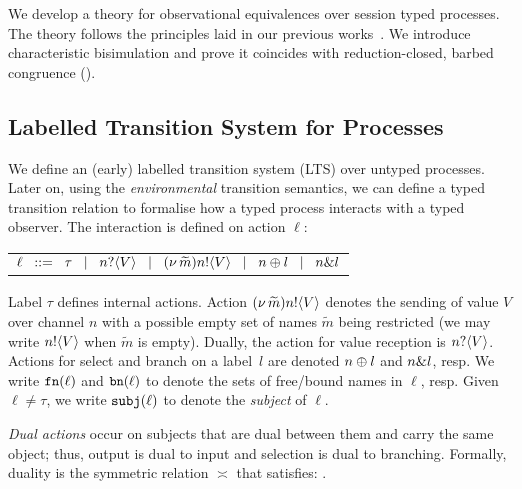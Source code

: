 \noi We develop a theory for observational equivalences over
session typed \HOp processes. The theory follows the principles
laid in our previous works~\cite{KYHH2015,KY2015}.
We introduce 
characteristic bisimulation
and prove
it coincides
with reduction-closed,
barbed congruence ().


\subsection{Labelled Transition System for Processes}\label{ss:lts}
\noi We define an (early) labelled transition system (LTS) over
untyped processes. 
Later on, using the \emph{environmental} transition semantics, 
we can define a typed transition relation to formalise 
how a typed process interacts with a typed observer. 
The interaction is defined on action $\ell$:
\begin{center}
\begin{tabular}{l}
	$\ell	\;\;::=\;\;   \tau 
		\;\;\;|\;\;\;	n ? \langle V \rangle 
		\;\;\;|\;\;\;	(\nu\, \widetilde{m}) n ! \langle V \rangle
		\;\;\;|\;\;\;	n \oplus l 
		\;\;\;|\;\;\;	n \& l $
\end{tabular}
\end{center}
\noi 
Label $\tau$ defines internal actions.
Action $(\nu\, \widetilde{m}) n ! \langle V \rangle$ denotes the sending of value $V$
over channel $n$ with
a possible empty set of names $\widetilde{m}$ being restricted 
(we may write $n ! \langle V \rangle$ when $\widetilde{m}$ is empty).
Dually, the action for value reception is 
$n ? \langle V \rangle$.
Actions for select
and branch on
a label~$l$ are denoted $n \oplus l$ and $n \& l$, resp.
We write $\mathtt{fn}(\ell)$ and $\mathtt{bn}(\ell)$ to denote the
 sets of free/bound names in $\ell$, resp.
Given $\ell \neq \tau$, we write 
$\mathtt{subj}(\ell)$
to denote the \emph{subject} of $\ell$.


\emph{Dual actions} %
occur on subjects that are dual between them and carry the same
object; thus, output is dual to input and 
selection is dual to branching.
Formally, duality 
is the symmetric relation $\asymp$ that satisfies:
.
%
%


